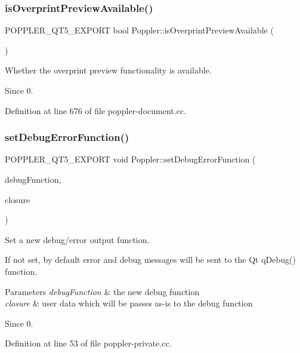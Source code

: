 \subsubsection{\texorpdfstring{is\+Overprint\+Preview\+Available()}{isOverprintPreviewAvailable()}}
{\footnotesize\ttfamily P\+O\+P\+P\+L\+E\+R\+\_\+\+Q\+T5\+\_\+\+E\+X\+P\+O\+RT bool Poppler\+::is\+Overprint\+Preview\+Available (\begin{DoxyParamCaption}{ }\end{DoxyParamCaption})}

Whether the overprint preview functionality is available.

\begin{DoxySince}{Since}
0. 
\end{DoxySince}


Definition at line 676 of file poppler-\/document.\+cc.

\mbox{\label{namespace_poppler_a010dcf12e3dae28959925da8cbf97cda}} 
\subsubsection{\texorpdfstring{set\+Debug\+Error\+Function()}{setDebugErrorFunction()}}
{\footnotesize\ttfamily P\+O\+P\+P\+L\+E\+R\+\_\+\+Q\+T5\+\_\+\+E\+X\+P\+O\+RT void Poppler\+::set\+Debug\+Error\+Function (\begin{DoxyParamCaption}\item[{\hyperlink{namespace_poppler_a6743a660a5959ea508737ff913e3bd56}{Poppler\+Debug\+Func}}]{debug\+Function,  }\item[{const Q\+Variant \&}]{closure }\end{DoxyParamCaption})}

Set a new debug/error output function.

If not set, by default error and debug messages will be sent to the Qt {\ttfamily q\+Debug()} function.


\begin{DoxyParams}{Parameters}
{\em debug\+Function} & the new debug function \\
\hline
{\em closure} & user data which will be passes as-\/is to the debug function\\
\hline
\end{DoxyParams}
\begin{DoxySince}{Since}
0. 
\end{DoxySince}


Definition at line 53 of file poppler-\/private.\+cc.

